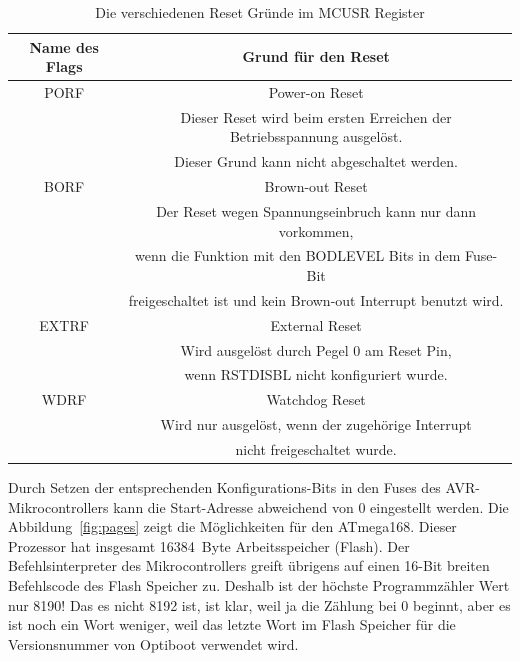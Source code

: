 \begin{table}[H]
  \begin{center}
    \begin{tabular}{| c | c |}
    \hline
              Name des Flags & Grund für den Reset \\
    \hline
    \hline
              PORF & Power-on Reset \\
                   & Dieser Reset wird beim ersten Erreichen der Betriebsspannung ausgelöst.\\
                   & Dieser Grund kann nicht abgeschaltet werden.\\
    \hline
              BORF & Brown-out Reset \\
                   & Der Reset wegen Spannungseinbruch kann nur dann vorkommen, \\
                   & wenn die Funktion mit den BODLEVEL Bits in dem Fuse-Bit \\
                   & freigeschaltet ist und kein Brown-out Interrupt benutzt wird.\\
    \hline
              EXTRF & External Reset \\
                    & Wird ausgelöst durch Pegel 0 am Reset Pin, \\
                    & wenn RSTDISBL nicht konfiguriert wurde. \\
    \hline
              WDRF & Watchdog Reset \\
		   & Wird nur ausgelöst, wenn der zugehörige Interrupt \\
		   & nicht freigeschaltet wurde. \\
    \hline
    \end{tabular}
  \end{center}
  \caption{Die verschiedenen Reset Gründe im MCUSR Register}
  \label{tab:resets}
\end{table}

Durch Setzen der entsprechenden Konfigurations-Bits in den Fuses des AVR-Mikrocontrollers
kann die Start-Adresse abweichend von 0 eingestellt werden.
Die Abbildung~\ref{fig:pages} zeigt die Möglichkeiten für den ATmega168.
Dieser Prozessor hat insgesamt 16384~Byte Arbeitsspeicher (Flash).
Der Befehlsinterpreter des Mikrocontrollers greift übrigens auf
einen 16-Bit breiten Befehlscode des Flash Speicher zu.
Deshalb ist der höchste Programmzähler Wert nur 8190!
Das es nicht 8192 ist, ist klar, weil ja die Zählung bei 0 beginnt,
aber es ist noch ein Wort weniger, weil das letzte Wort im Flash Speicher
für die Versionsnummer von Optiboot verwendet wird.

